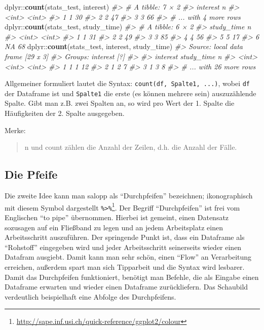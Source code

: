 \documentclass[12pt,]{book}
\makeatletter
\newenvironment{Shaded}{\begin{snugshade}}{\end{snugshade}}
\newcommand{\KeywordTok}[1]{\textcolor[rgb]{0.13,0.29,0.53}{\textbf{{#1}}}}
\newcommand{\CommentTok}[1]{\textcolor[rgb]{0.56,0.35,0.01}{\textit{{#1}}}}
\newcommand{\NormalTok}[1]{{#1}}
\newenvironment{kframe}{%
\medskip{}
\setlength{\fboxsep}{.8em}
 \def\at@end@of@kframe{}%
 \ifinner\ifhmode%
  \def\at@end@of@kframe{\end{minipage}}%
  \begin{minipage}{\columnwidth}%
 \fi\fi%
 \def\FrameCommand##1{\hskip\@totalleftmargin \hskip-\fboxsep
 \colorbox{shadecolor}{##1}\hskip-\fboxsep
     \hskip-\linewidth \hskip-\@totalleftmargin \hskip\columnwidth}%
 \MakeFramed {\advance\hsize-\width
   \@totalleftmargin\z@ \linewidth\hsize
   \@setminipage}}%
 {\par\unskip\endMakeFramed%
 \at@end@of@kframe}
\renewenvironment{Shaded}{\begin{kframe}}{\end{kframe}}
\makeatother
\begin{document}
\begin{Shaded}
\begin{Highlighting}[]
\NormalTok{dplyr::}\KeywordTok{count}\NormalTok{(stats_test, interest)}
\CommentTok{#> # A tibble: 7 × 2}
\CommentTok{#>   interest     n}
\CommentTok{#>      <int> <int>}
\CommentTok{#> 1        1    30}
\CommentTok{#> 2        2    47}
\CommentTok{#> 3        3    66}
\CommentTok{#> # ... with 4 more rows}
\NormalTok{dplyr::}\KeywordTok{count}\NormalTok{(stats_test, study_time)}
\CommentTok{#> # A tibble: 6 × 2}
\CommentTok{#>   study_time     n}
\CommentTok{#>        <int> <int>}
\CommentTok{#> 1          1    31}
\CommentTok{#> 2          2    49}
\CommentTok{#> 3          3    85}
\CommentTok{#> 4          4    56}
\CommentTok{#> 5          5    17}
\CommentTok{#> 6         NA    68}
\NormalTok{dplyr::}\KeywordTok{count}\NormalTok{(stats_test, interest, study_time)}
\CommentTok{#> Source: local data frame [29 x 3]}
\CommentTok{#> Groups: interest [?]}
\CommentTok{#> }
\CommentTok{#>   interest study_time     n}
\CommentTok{#>      <int>      <int> <int>}
\CommentTok{#> 1        1          1    12}
\CommentTok{#> 2        1          2     7}
\CommentTok{#> 3        1          3     8}
\CommentTok{#> # ... with 26 more rows}
\end{Highlighting}
\end{Shaded}

Allgemeiner formuliert lautet die Syntax:
\texttt{count(df,\ Spalte1,\ ...)}, wobei \texttt{df} der Dataframe ist
und \texttt{Spalte1} die erste (es können mehrere sein) auszuzählende
Spalte. Gibt man z.B. zwei Spalten an, so wird pro Wert der 1. Spalte
die Häufigkeiten der 2. Spalte ausgegeben.

Merke:

\begin{quote}
n und count zählen die Anzahl der Zeilen, d.h. die Anzahl der Fälle.
\end{quote}

\subsection{Die Pfeife}\label{die-pfeife}

Die zweite Idee kann man salopp als ``Durchpfeifen'' bezeichnen;
ikonographisch mit diesem Symbol dargestellt
\texttt{\%\textgreater{}\%}\footnote{\url{http://sape.inf.usi.ch/quick-reference/ggplot2/colour}}.
Der Begriff ``Durchpfeifen'' ist frei vom Englischen ``to pipe''
übernommen. Hierbei ist gemeint, einen Datensatz sozusagen auf ein
Fließband zu legen und an jedem Arbeitsplatz einen Arbeitsschritt
auszuführen. Der springende Punkt ist, dass ein Dataframe als
``Rohstoff'' eingegeben wird und jeder Arbeitsschritt seinerseits wieder
einen Datafram ausgiebt. Damit kann man sehr schön, einen ``Flow'' an
Verarbeitung erreichen, außerdem spart man sich Tipparbeit und die
Syntax wird lesbarer. Damit das Durchpfeifen funktioniert, benötigt man
Befehle, die als Eingabe einen Dataframe erwarten und wieder einen
Dataframe zurückliefern. Das Schaubild verdeutlich beispielhaft eine
Abfolge des Durchpfeifens.
\end{document}
